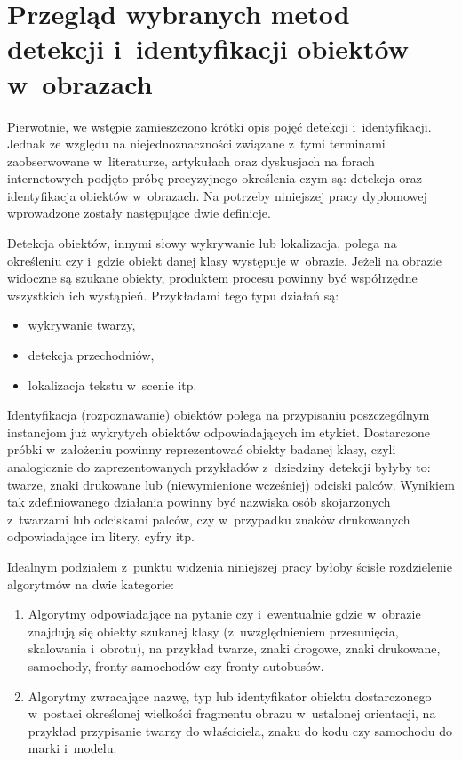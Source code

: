 \chapter{Przegląd wybranych metod detekcji i~identyfikacji
obiektów w~obrazach}

Pierwotnie, we wstępie zamieszczono krótki opis pojęć detekcji i~identyfikacji.
Jednak ze względu na niejednoznaczności związane z~tymi terminami
zaobserwowane w~literaturze,
artykułach oraz dyskusjach na forach internetowych podjęto próbę
precyzyjnego określenia czym są: detekcja oraz identyfikacja
obiektów w~obrazach. Na potrzeby niniejszej pracy dyplomowej wprowadzone
zostały następujące dwie definicje.

Detekcja obiektów, innymi słowy wykrywanie lub lokalizacja,
polega na określeniu czy i~gdzie obiekt danej klasy występuje w~obrazie.
Jeżeli na obrazie widoczne są szukane obiekty,
produktem procesu powinny być współrzędne wszystkich ich wystąpień.
Przykładami tego typu działań są:

\begin{itemize}
    \item wykrywanie twarzy,
    \item detekcja przechodniów,
    \item lokalizacja tekstu w~scenie itp.
\end{itemize}

Identyfikacja (rozpoznawanie) obiektów polega na przypisaniu
poszczególnym instancjom już wykrytych obiektów odpowiadających im
etykiet. Dostarczone próbki w~założeniu powinny reprezentować
obiekty badanej klasy, czyli analogicznie do zaprezentowanych
przykładów z~dziedziny detekcji byłyby to: twarze,
znaki drukowane lub (niewymienione wcześniej) odciski palców.
Wynikiem tak zdefiniowanego działania powinny być nazwiska osób
skojarzonych z~twarzami lub odciskami palców,
czy w~przypadku znaków drukowanych odpowiadające im litery, cyfry
itp.

Idealnym podziałem z~punktu widzenia niniejszej pracy byłoby ścisłe
rozdzielenie algorytmów na dwie kategorie:

\begin{enumerate}
    \item Algorytmy odpowiadające na pytanie czy i~ewentualnie gdzie
        w~obrazie
        znajdują się obiekty szukanej klasy (z~uwzględnieniem przesunięcia,
        skalowania i~obrotu), na przykład twarze, znaki drogowe, znaki
        drukowane, samochody, fronty samochodów czy fronty autobusów.
    \item Algorytmy zwracające nazwę, typ lub identyfikator obiektu
        dostarczonego w~postaci określonej wielkości fragmentu obrazu
        w~ustalonej orientacji, na przykład przypisanie twarzy do
        właściciela, znaku do kodu czy samochodu do marki i~modelu.
\end{enumerate}

